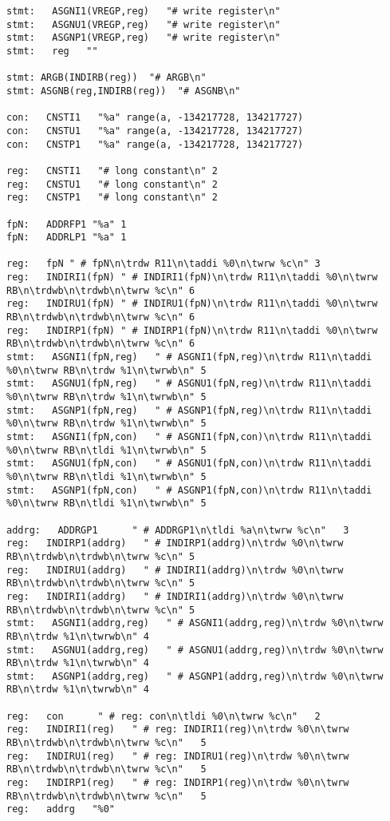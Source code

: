{\begin{verbatim}
stmt:   ASGNI1(VREGP,reg)   "# write register\n"
stmt:   ASGNU1(VREGP,reg)   "# write register\n"
stmt:   ASGNP1(VREGP,reg)   "# write register\n"
stmt:   reg   ""

stmt: ARGB(INDIRB(reg))  "# ARGB\n"
stmt: ASGNB(reg,INDIRB(reg))  "# ASGNB\n"

con:   CNSTI1   "%a" range(a, -134217728, 134217727)
con:   CNSTU1   "%a" range(a, -134217728, 134217727)
con:   CNSTP1   "%a" range(a, -134217728, 134217727)

reg:   CNSTI1   "# long constant\n" 2
reg:   CNSTU1   "# long constant\n" 2
reg:   CNSTP1   "# long constant\n" 2

fpN:   ADDRFP1 "%a" 1
fpN:   ADDRLP1 "%a" 1

reg:   fpN " # fpN\n\trdw R11\n\taddi %0\n\twrw %c\n" 3
reg:   INDIRI1(fpN) " # INDIRI1(fpN)\n\trdw R11\n\taddi %0\n\twrw RB\n\trdwb\n\trdwb\n\twrw %c\n" 6
reg:   INDIRU1(fpN) " # INDIRU1(fpN)\n\trdw R11\n\taddi %0\n\twrw RB\n\trdwb\n\trdwb\n\twrw %c\n" 6
reg:   INDIRP1(fpN) " # INDIRP1(fpN)\n\trdw R11\n\taddi %0\n\twrw RB\n\trdwb\n\trdwb\n\twrw %c\n" 6
stmt:   ASGNI1(fpN,reg)   " # ASGNI1(fpN,reg)\n\trdw R11\n\taddi %0\n\twrw RB\n\trdw %1\n\twrwb\n" 5
stmt:   ASGNU1(fpN,reg)   " # ASGNU1(fpN,reg)\n\trdw R11\n\taddi %0\n\twrw RB\n\trdw %1\n\twrwb\n" 5
stmt:   ASGNP1(fpN,reg)   " # ASGNP1(fpN,reg)\n\trdw R11\n\taddi %0\n\twrw RB\n\trdw %1\n\twrwb\n" 5
stmt:   ASGNI1(fpN,con)   " # ASGNI1(fpN,con)\n\trdw R11\n\taddi %0\n\twrw RB\n\tldi %1\n\twrwb\n" 5
stmt:   ASGNU1(fpN,con)   " # ASGNU1(fpN,con)\n\trdw R11\n\taddi %0\n\twrw RB\n\tldi %1\n\twrwb\n" 5
stmt:   ASGNP1(fpN,con)   " # ASGNP1(fpN,con)\n\trdw R11\n\taddi %0\n\twrw RB\n\tldi %1\n\twrwb\n" 5

addrg:   ADDRGP1      " # ADDRGP1\n\tldi %a\n\twrw %c\n"   3
reg:   INDIRP1(addrg)   " # INDIRP1(addrg)\n\trdw %0\n\twrw RB\n\trdwb\n\trdwb\n\twrw %c\n" 5
reg:   INDIRU1(addrg)   " # INDIRI1(addrg)\n\trdw %0\n\twrw RB\n\trdwb\n\trdwb\n\twrw %c\n" 5
reg:   INDIRI1(addrg)   " # INDIRI1(addrg)\n\trdw %0\n\twrw RB\n\trdwb\n\trdwb\n\twrw %c\n" 5
stmt:   ASGNI1(addrg,reg)   " # ASGNI1(addrg,reg)\n\trdw %0\n\twrw RB\n\trdw %1\n\twrwb\n" 4
stmt:   ASGNU1(addrg,reg)   " # ASGNU1(addrg,reg)\n\trdw %0\n\twrw RB\n\trdw %1\n\twrwb\n" 4
stmt:   ASGNP1(addrg,reg)   " # ASGNP1(addrg,reg)\n\trdw %0\n\twrw RB\n\trdw %1\n\twrwb\n" 4

reg:   con      " # reg: con\n\tldi %0\n\twrw %c\n"   2
reg:   INDIRI1(reg)   " # reg: INDIRI1(reg)\n\trdw %0\n\twrw RB\n\trdwb\n\trdwb\n\twrw %c\n"   5
reg:   INDIRU1(reg)   " # reg: INDIRU1(reg)\n\trdw %0\n\twrw RB\n\trdwb\n\trdwb\n\twrw %c\n"   5
reg:   INDIRP1(reg)   " # reg: INDIRP1(reg)\n\trdw %0\n\twrw RB\n\trdwb\n\trdwb\n\twrw %c\n"   5
reg:   addrg   "%0"


\end{verbatim}}
